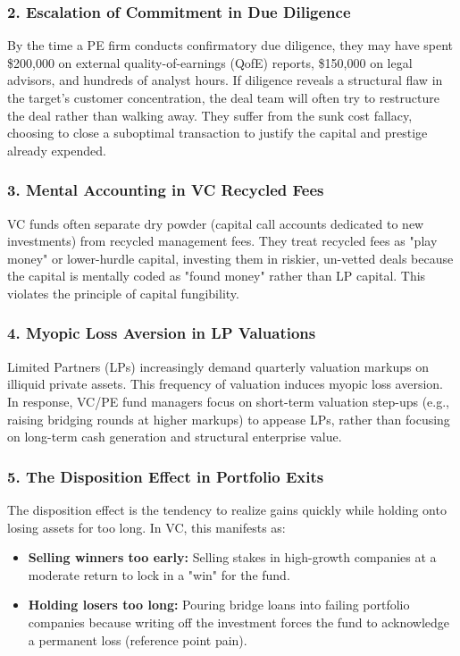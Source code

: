 \documentclass[11pt,a4paper]{article}
\begin{document}
\subsubsection{2. Escalation of Commitment in Due Diligence}
By the time a PE firm conducts confirmatory due diligence, they may have spent \$200,000 on external quality-of-earnings (QofE) reports, \$150,000 on legal advisors, and hundreds of analyst hours. If diligence reveals a structural flaw in the target's customer concentration, the deal team will often try to restructure the deal rather than walking away. They suffer from the sunk cost fallacy, choosing to close a suboptimal transaction to justify the capital and prestige already expended.

\subsubsection{3. Mental Accounting in VC Recycled Fees}
VC funds often separate dry powder (capital call accounts dedicated to new investments) from recycled management fees. They treat recycled fees as "play money" or lower-hurdle capital, investing them in riskier, un-vetted deals because the capital is mentally coded as "found money" rather than LP capital. This violates the principle of capital fungibility.

\subsubsection{4. Myopic Loss Aversion in LP Valuations}
Limited Partners (LPs) increasingly demand quarterly valuation markups on illiquid private assets. This frequency of valuation induces myopic loss aversion. In response, VC/PE fund managers focus on short-term valuation step-ups (e.g., raising bridging rounds at higher markups) to appease LPs, rather than focusing on long-term cash generation and structural enterprise value.

\subsubsection{5. The Disposition Effect in Portfolio Exits}
The disposition effect is the tendency to realize gains quickly while holding onto losing assets for too long. In VC, this manifests as:
\begin{itemize}
    \item \textbf{Selling winners too early:} Selling stakes in high-growth companies at a moderate return to lock in a "win" for the fund.
    \item \textbf{Holding losers too long:} Pouring bridge loans into failing portfolio companies because writing off the investment forces the fund to acknowledge a permanent loss (reference point pain).
\end{itemize}
\end{document}
